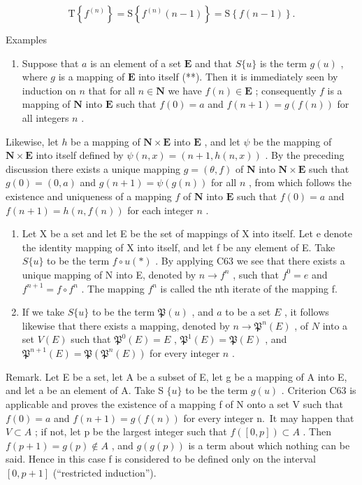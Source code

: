 \[
\mathrm{T} \left\{f ^ {(n)} \right\} = \mathrm{S} \left\{f ^ {(n)} (n - 1) \right\} = \mathrm{S} \left\{f (n - 1) \right\}.
\]

Examples

\begin{enumerate}
\def\labelenumi{(\arabic{enumi})}
\tightlist
\item
  Suppose that \(a\) is an element of a set \(\mathbf{E}\) and that \(S\{u\}\) is the term \(g(u)\) , where \(g\) is a mapping of \(\mathbf{E}\) into itself (**). Then it is immediately seen by induction on \(n\) that for all \(n \in \mathbf{N}\) we have \(f(n) \in \mathbf{E}\) ; consequently \(f\) is a mapping of \(\mathbf{N}\) into \(\mathbf{E}\) such that \(f(0) = a\) and \(f(n + 1) = g(f(n))\) for all integers \(n\) .
\end{enumerate}

Likewise, let \(h\) be a mapping of \(\mathbf{N} \times \mathbf{E}\) into \(\mathbf{E}\) , and let \(\psi\) be the mapping of \(\mathbf{N} \times \mathbf{E}\) into itself defined by \(\psi(n, x) = (n + 1, h(n, x))\) . By the preceding discussion there exists a unique mapping \(g = (\theta, f)\) of \(\mathbf{N}\) into \(\mathbf{N} \times \mathbf{E}\) such that \(g(0) = (0, a)\) and \(g(n + 1) = \psi(g(n))\) for all \(n\) , from which follows the existence and uniqueness of a mapping \(f\) of \(\mathbf{N}\) into \(\mathbf{E}\) such that \(f(0) = a\) and \(f(n + 1) = h(n, f(n))\) for each integer \(n\) .

\begin{enumerate}
\def\labelenumi{(\arabic{enumi})}
\setcounter{enumi}{1}
\item
  Let X be a set and let E be the set of mappings of X into itself. Let e denote the identity mapping of X into itself, and let f be any element of E. Take \(S\{u\}\) to be the term \(f \circ u (*)\) . By applying C63 we see that there exists a unique mapping of N into E, denoted by \(n \to f^n\) , such that \(f^0 = e\) and \(f^{n+1} = f \circ f^n\) . The mapping \(f^n\) is called the nth iterate of the mapping f.
\item
  If we take \(S \{u\}\) to be the term \(\mathfrak{P}(u)\) , and \(a\) to be a set \(E\) , it follows likewise that there exists a mapping, denoted by \(n \to \mathfrak{P}^n(E)\) , of \(N\) into a set \(V(E)\) such that \(\mathfrak{P}^0(E) = E\) , \(\mathfrak{P}^1(E) = \mathfrak{P}(E)\) , and \(\mathfrak{P}^{n+1}(E) = \mathfrak{P}(\mathfrak{P}^n(E))\) for every integer \(n\) .
\end{enumerate}

Remark. Let E be a set, let A be a subset of E, let g be a mapping of A into E, and let a be an element of A. Take S \(\{u\}\) to be the term \(g(u)\) . Criterion C63 is applicable and proves the existence of a mapping f of N onto a set V such that \(f(0) = a\) and \(f(n+1) = g(f(n))\) for every integer n.~It may happen that \(V \subset A\) ; if not, let p be the largest integer such that \(f([0, p]) \subset A\) . Then \(f(p+1) = g(p) \notin A\) , and \(g(g(p))\) is a term about which nothing can be said. Hence in this case f is considered to be defined only on the interval \([0, p+1]\) (``restricted induction'').

